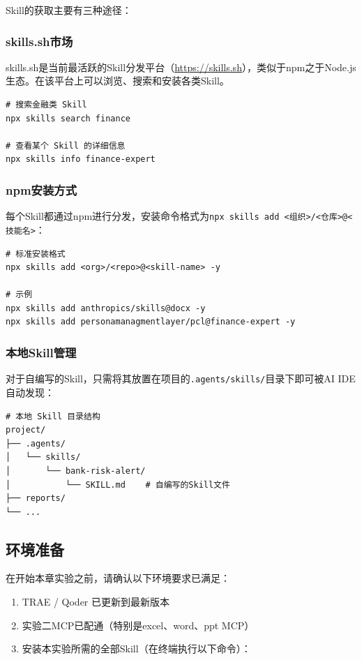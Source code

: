 Skill的获取主要有三种途径：

\subsubsection{skills.sh市场}

skills.sh是当前最活跃的Skill分发平台（\url{https://skills.sh}），类似于npm之于Node.js生态。在该平台上可以浏览、搜索和安装各类Skill。

\begin{lstlisting}[style=shell]
# 搜索金融类 Skill
npx skills search finance

# 查看某个 Skill 的详细信息
npx skills info finance-expert
\end{lstlisting}

\subsubsection{npm安装方式}

每个Skill都通过npm进行分发，安装命令格式为\texttt{npx skills add <组织>/<仓库>@<技能名>}：

\begin{lstlisting}[style=shell]
# 标准安装格式
npx skills add <org>/<repo>@<skill-name> -y

# 示例
npx skills add anthropics/skills@docx -y
npx skills add personamanagmentlayer/pcl@finance-expert -y
\end{lstlisting}

\subsubsection{本地Skill管理}

对于自编写的Skill，只需将其放置在项目的\texttt{.agents/skills/}目录下即可被AI IDE自动发现：

\begin{lstlisting}[style=shell]
# 本地 Skill 目录结构
project/
├── .agents/
│   └── skills/
│       └── bank-risk-alert/
│           └── SKILL.md    # 自编写的Skill文件
├── reports/
└── ...
\end{lstlisting}

\subsection{环境准备}

在开始本章实验之前，请确认以下环境要求已满足：

\begin{enumerate}[leftmargin=2em]
  \item TRAE / Qoder 已更新到最新版本
  \item 实验二MCP已配通（特别是excel、word、ppt MCP）
  \item 安装本实验所需的全部Skill（在终端执行以下命令）：
\end{enumerate}

